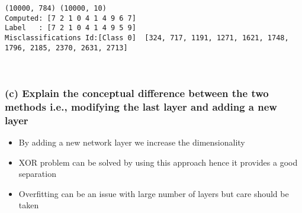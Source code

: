 \documentclass[11pt]{article}
\providecommand{\tightlist}{%
      \setlength{\itemsep}{0pt}\setlength{\parskip}{0pt}}
\begin{document}
    \begin{Verbatim}[commandchars=\\\{\}]
(10000, 784) (10000, 10)
Computed: [7 2 1 0 4 1 4 9 6 7]
Label   : [7 2 1 0 4 1 4 9 5 9]
Misclassifications Id:[Class 0]  [324, 717, 1191, 1271, 1621, 1748, 1796, 2185, 2370, 2631, 2713]

    \end{Verbatim}

    \begin{center}
    \end{center}
    { \hspace*{\fill} \\}
    
    \subsubsection{(c) Explain the conceptual difference between the two
methods i.e., modifying the last layer and adding a new
layer}\label{c-explain-the-conceptual-difference-between-the-two-methods-i.e.-modifying-the-last-layer-and-adding-a-new-layer}

\begin{itemize}
\tightlist
\item
  By adding a new network layer we increase the dimensionality
\item
  XOR problem can be solved by using this approach hence it provides a
  good separation
\item
  Overfitting can be an issue with large number of layers but care
  should be taken
\end{itemize}


    
    
    
    
\end{document}
